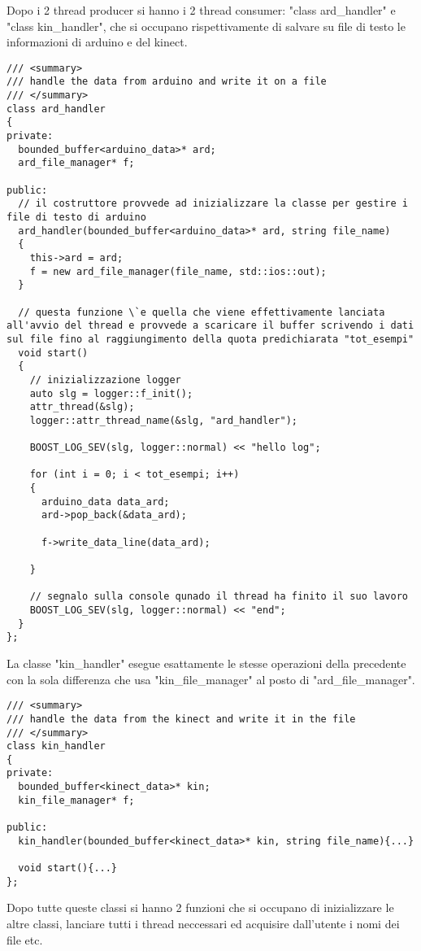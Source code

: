 \documentclass[10pt,a4paper]{article}
\begin{document}
%
%
Dopo i 2 thread producer si hanno i 2 thread consumer: "class ard\_handler" e "class kin\_handler", che si occupano rispettivamente di salvare su file di testo le informazioni di arduino e del kinect. \\ 
\begin{lstlisting}[style=mycpp, caption=librerie usate, captionpos=b]
/// <summary>
/// handle the data from arduino and write it on a file
/// </summary>
class ard_handler
{
private:
  bounded_buffer<arduino_data>* ard;
  ard_file_manager* f;

public:
  // il costruttore provvede ad inizializzare la classe per gestire i file di testo di arduino
  ard_handler(bounded_buffer<arduino_data>* ard, string file_name)
  {
    this->ard = ard;
    f = new ard_file_manager(file_name, std::ios::out);
  }

  // questa funzione \`e quella che viene effettivamente lanciata all'avvio del thread e provvede a scaricare il buffer scrivendo i dati sul file fino al raggiungimento della quota predichiarata "tot_esempi"
  void start()
  {
	// inizializzazione logger
    auto slg = logger::f_init();
    attr_thread(&slg);
    logger::attr_thread_name(&slg, "ard_handler");

    BOOST_LOG_SEV(slg, logger::normal) << "hello log";

    for (int i = 0; i < tot_esempi; i++)
    {
      arduino_data data_ard;
      ard->pop_back(&data_ard);

      f->write_data_line(data_ard);

    }
    
	// segnalo sulla console qunado il thread ha finito il suo lavoro
    BOOST_LOG_SEV(slg, logger::normal) << "end";
  }
};
\end{lstlisting}
%
%
La classe "kin\_handler" esegue esattamente le stesse operazioni della precedente con la sola differenza che usa "kin\_file\_manager" al posto di "ard\_file\_manager".
\begin{lstlisting}[style=mycpp, caption=librerie usate, captionpos=b]
/// <summary>
/// handle the data from the kinect and write it in the file
/// </summary>
class kin_handler
{
private:
  bounded_buffer<kinect_data>* kin;
  kin_file_manager* f;

public:
  kin_handler(bounded_buffer<kinect_data>* kin, string file_name){...}

  void start(){...}
};
\end{lstlisting}
%
%
Dopo tutte queste classi si hanno 2 funzioni che si occupano di inizializzare le altre classi, lanciare tutti i thread neccessari ed acquisire dall'utente i nomi dei file etc.
\end{document}
